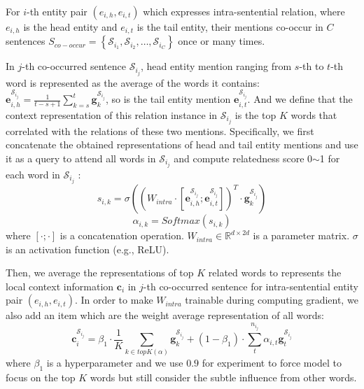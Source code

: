 \documentclass[11pt,a4paper]{article}
\begin{document}
For $i$-th entity pair $(e_{i,h}, e_{i,t})$ which expresses intra-sentential relation, where $e_{i,h}$ is the head entity and $e_{i,t}$ is the tail entity, their mentions co-occur in $C$ sentences $S_{co-occur} = \left\{\mathcal{S}_{i_1}, \mathcal{S}_{i_2}, \ldots,  \mathcal{S}_{i_C}\right\}$ once or many times.

In $j$-th co-occurred sentence $\mathcal{S}_{i_j}$, head entity mention ranging from $s$-th to $t$-th word is represented as the average of the words it contains: $\textbf{e}^{\mathcal{S}_{i_j}}_{i,h} = \frac{1}{t-s+1} \sum^{t}_{k=s}\textbf{g}^{\mathcal{S}_{i_j}}_{k}$, so is the tail entity mention $\textbf{e}^{\mathcal{S}_{i_j}}_{i,t}$. 
And we define that the context representation of this relation instance in $\mathcal{S}_{i_j}$ is the top $K$ words that correlated with the relations of these two mentions. Specifically, we first concatenate the obtained representations of head and tail entity mentions and use it as a query to attend all words in $\mathcal{S}_{i_j}$ and compute relatedness score 0$\sim$1 for each word in $\mathcal{S}_{i_j}$ :
\begin{equation}
s_{i,k} = \sigma((W_{intra} \cdot [\textbf{e}^{\mathcal{S}_{i_j}}_{i,h}; \textbf{e}^{\mathcal{S}_{i_j}}_{i,t}])^T \cdot \textbf{g}^{\mathcal{S}_{i_j}}_k)
\end{equation}
\begin{equation}
    \alpha_{i,k} = Softmax(s_{i,k})
\end{equation}
where $[\cdot;\cdot]$ is a concatenation operation. $W_{intra} \in \mathbb{R}^{d \times 2d}$ is a parameter matrix. $\sigma$ is an activation function (e.g., ReLU).

Then, we average the representations of top $K$ related words to represents the local context information $\textbf{c}_{i}$ in $j$-th co-occurred sentence for intra-sentential entity pair $(e_{i,h}, e_{i,t})$. In order to make $W_{intra}$ trainable during computing gradient, we also add an item which are the weight average representation of all words:
\begin{equation}
    \textbf{c}^{\mathcal{S}_{i_j}}_{i} = \beta_{1} \cdot \frac{1}{K}\sum_{k \in topK(\alpha)} \textbf{g}^{\mathcal{S}_{i_j}}_k + (1 - \beta_{1}) \cdot \sum^{n_{i_j}}_{t} \alpha_{i,t} \textbf{g}^{\mathcal{S}_{i_j}}_t
\end{equation}
where $\beta_{1}$ is a hyperparameter and we use $0.9$ for experiment to force model to focus on the top $K$ words but still consider the subtle influence from other words.
\end{document}
